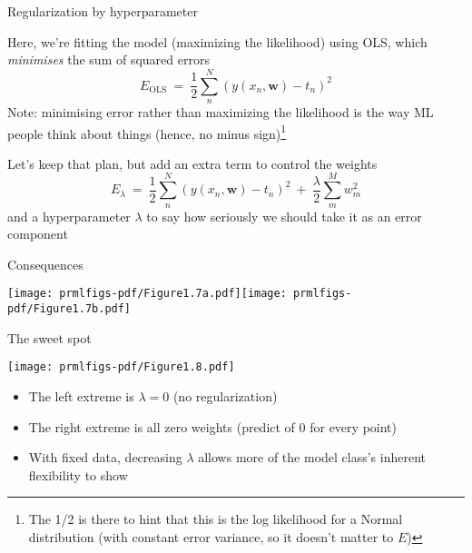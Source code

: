 \documentclass{hertieteaching}
\begin{document}
\begin{frame}{Regularization by hyperparameter}

Here, we're fitting the model (maximizing the likelihood) using OLS, which \textit{minimises} the sum of squared errors  
$$
E_\text{OLS} ~=~ \frac{1}{2}\sum^{N}_n (y(x_n, \textbf{w}) - t_n)^2
$$
Note: minimising error rather than maximizing the likelihood is the way ML people think about things (hence, no minus sign)\footnote{The 1/2 is there to hint that this is the log likelihood for a Normal distribution (with constant error variance, so it doesn't matter to $E$)}

\pause

Let's keep that plan, but add an extra term to control the weights
$$
E_{\lambda} ~=~ \frac{1}{2}\sum^{N}_n (y(x_n, \textbf{w}) - t_n)^2 ~+~ \frac{\lambda}{2} \sum^{M}_m w_m^2
$$
and a hyperparameter $\lambda$ to say how seriously we should take it as an error component

\end{frame}

\begin{frame}{Consequences}
\bigskip
\centerline{\texttt{[image: prmlfigs-pdf/Figure1.7a.pdf]}\hspace{5em}\texttt{[image: prmlfigs-pdf/Figure1.7b.pdf]}}

\end{frame}


\begin{frame}{The sweet spot}

\medskip
\centerline{\texttt{[image: prmlfigs-pdf/Figure1.8.pdf]}}


\begin{itemize}
  \item The left extreme is $\lambda =0$ (no regularization)
  \item The right extreme is all zero weights (predict of 0 for every point)
  \item With fixed data, decreasing $\lambda$ allows more of the model class's inherent flexibility to show
\end{itemize}


\end{frame}
\end{document}
